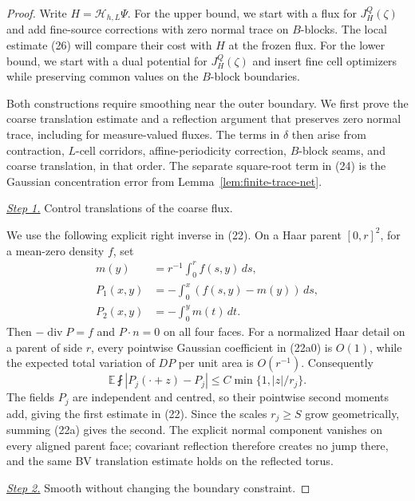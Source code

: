 \documentclass{smfart}
\theoremstyle{definition}
\newcommand{\1}{\mathbf 1}
\begin{document}
\begin{proof}
Write $H=\mathcal H_{h,L}\Psi$.  For the upper bound, we start with a
flux for $J_H^Q(\zeta)$ and add fine-source corrections with zero normal
trace on $B$-blocks.  The local estimate (26) will compare their cost
with $H$ at the frozen flux.  For the lower bound, we start with a dual
potential for $J_H^Q(\zeta)$ and insert fine cell optimizers while
preserving common values on the $B$-block boundaries.

Both constructions require smoothing near the outer boundary.  We first
prove the coarse translation estimate and a reflection argument that
preserves zero normal trace, including for measure-valued fluxes.  The
terms in $\delta$ then arise from contraction, $L$-cell corridors,
affine-periodicity correction, $B$-block seams, and coarse translation,
in that order.  The separate square-root term in (24) is the Gaussian
concentration error from Lemma~\ref{lem:finite-trace-net}.

\smallskip\noindent
\underline{\textit{Step 1.}} Control translations of the coarse flux.

We use the following explicit right inverse in (22).
On a Haar parent $[0,r]^2$, for a mean-zero density $f$, set
\begin{equation}
\begin{aligned}
m(y)&=r^{-1}\int_0^r f(s,y)\,ds,\\
P_1(x,y)&=-\int_0^x(f(s,y)-m(y))\,ds,\\
P_2(x,y)&=-\int_0^y m(t)\,dt.
\end{aligned}
\tag{22a0}
\end{equation}
Then $-\operatorname {div}P=f$ and $P\cdot n=0$ on all four
faces.  For a normalized Haar detail on a parent of side $r$, every
pointwise Gaussian coefficient in (22a0) is $O(1)$, while the expected
total variation of $DP$ per unit area is $O(r^{-1})$.
Consequently
\begin{equation}
\mathbb E\fint|P_ j(\cdot+z)-P_ j|
\leq C\min\{1,|z|/r_ j\}.
\tag{22a}
\end{equation}
The fields $P_ j$ are independent and centred, so their pointwise
second moments add, giving the first estimate in (22).  Since the
scales $r_ j\geq S$ grow geometrically, summing (22a) gives the second.
The explicit normal component vanishes on every aligned parent face;
covariant reflection therefore creates no jump there, and the same
BV translation estimate holds on the reflected torus.

\smallskip\noindent
\underline{\textit{Step 2.}} Smooth without changing the boundary constraint.


\end{proof}
\end{document}
